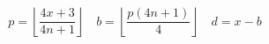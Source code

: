 \documentclass{article}
\begin{document}
\pagestyle{empty}
\[
p = \left\lfloor\frac{4x+3}{4n+1}\right\rfloor \quad
b = \left\lfloor \frac{p(4n+1)}{4} \right\rfloor  \quad
d = x-b
\]
\end{document}
